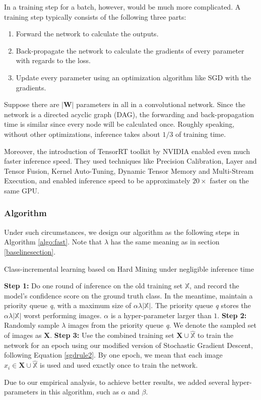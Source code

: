 In a training step for a batch, however, would be much more complicated. A training step typically consists of the following three parts:
\begin{enumerate}
	\item  Forward the network to calculate the outputs.
	\item Back-propagate the network to calculate the gradients of every parameter with regards to the loss.
	\item Update every parameter using an optimization algorithm like SGD with the gradients.
\end{enumerate}
Suppose there are $|\mathbf{W}|$ parameters in all in a convolutional network. Since the network is a directed acyclic graph (DAG), the forwarding and back-propagation time is similar since every node will be calculated once. Roughly speaking, without other optimizations, inference takes about $1/3$ of training time.

Moreover, the introduction of TensorRT toolkit by NVIDIA enabled even much faster inference speed. They used techniques like Precision Calibration, Layer and Tensor Fusion, Kernel Auto-Tuning, Dynamic Tensor Memory and Multi-Stream Execution, and enabled inference speed to be approximately $20\times$ faster on the same GPU.

\subsubsection{Algorithm}
Under such circumstances, we design our algorithm as the following steps in Algorithm \ref{algo:fast}. Note that $\lambda$ has the same meaning as in section \ref{baselinesection}.

\begin{algorithm}
\caption{Class-incremental learning based on Hard Mining under negligible inference time}
\label{algo:fast}
	\begin{algorithmic}
		\State \textbf{Step 1:} Do one round of inference on the old training set $\mathbb{X}$, and record the model's confidence score on the ground truth class. In the meantime, maintain a priority queue \textit{q}, with a maximum size of $\alpha \lambda |\mathbb{X}|$. The priority queue \textit{q} stores the $\alpha \lambda |\mathbb{X}|$ worst performing images. $\alpha$ is a hyper-parameter larger than $1$.
		\State \textbf{Step 2:} Randomly sample $\lambda$ images from the priority queue \textit{q}. We denote the sampled set of images as $\mathbf{X}$. 
		\State \textbf{Step 3:} Use the combined training set $\mathbf{X} \cup \hat{\mathbb{X}}$ to train the network for an epoch using our modified version of Stochastic Gradient Descent, following Equation \ref{sgdrule2}. By one epoch, we mean that each image $x_i \in \mathbf{X} \cup \hat{\mathbb{X}}$ is used and used exactly once to train the network.
		\EndFor
	\end{algorithmic}
\end{algorithm}
Due to our empirical analysis, to achieve better results, we added several hyper-parameters in this algorithm, such as $\alpha$ and $\beta$. 

